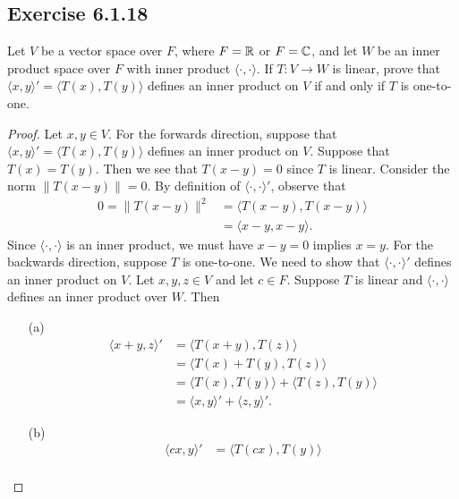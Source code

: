 \subsection*{Exercise 6.1.18}\label{Exercise 6.1.18} Let \( V  \) be a vector space over \( F  \), where \( F = \mathbb{R}  \) or \( F = \mathbb{C}  \), and let \( W  \) be an inner product space over \( F  \) with inner product \( \langle \cdot  ,  \cdot  \rangle \). If \( T: V \to W  \) is linear, prove that \( \langle x , y \rangle' = \langle T(x)  , T(y) \rangle \) defines an inner product on \( V  \) if and only if \( T  \) is one-to-one.
\begin{proof}
    Let \( x,y \in V  \). For the forwards direction, suppose that \( \langle x , y \rangle' = \langle  T(x)  , T(y) \rangle \) defines an inner product on \( V  \). Suppose that \( T(x) = T(y) \). Then we see that \( T(x-y) = 0   \) since \( T  \) is linear. Consider the norm \( \|T(x-y)\| = 0  \). By definition of \( \langle \cdot , \cdot \rangle'  \), observe that
    \begin{align*}
        0 = \|T(x-y)\|^{2} &= \langle T(x-y) , T(x-y)  \rangle \\
                       &= \langle x -y  , x - y  \rangle.
    \end{align*}
    Since \( \langle \cdot , \cdot \rangle \) is an inner product, we must have \( x - y = 0  \) implies \( x = y  \).
For the backwards direction, suppose \( T  \) is one-to-one. We need to show that \( \langle \cdot , \cdot \rangle' \) defines an inner product on \( V  \). Let \( x,y,z \in V  \) and let \( c \in F  \). Suppose \( T  \) is linear and \( \langle \cdot ,  \cdot  \rangle  \) defines an inner product over \( W  \). Then
\begin{enumerate}
    \item[(a)] 
        \begin{align*}
            \langle x + y  ,  z  \rangle' &= \langle  T(x+y)  , T(z) \rangle \\
                                          &=  \langle T(x) + T(y)  , T(z) \rangle \\
                                          &= \langle T(x)  , T(y) \rangle + \langle T(z)  , T(y)   \rangle \\
                                          &=  \langle x , y \rangle' + \langle z , y \rangle'.
        \end{align*}
    \item[(b)] 
        \begin{align*}
            \langle cx , y \rangle' &= \langle  T(cx)  , T(y) \rangle  \\

\end{align*}
\end{enumerate}
\end{proof}

